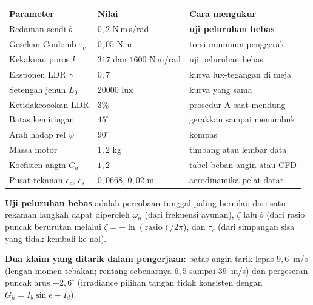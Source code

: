 \documentclass[11pt,a4paper]{article}
\newcommand{\degg}{^\circ}
\begin{document}
\begin{longtable}{p{5.4cm} p{3.0cm} p{6.4cm}}
\toprule
\textbf{Parameter} & \textbf{Nilai} & \textbf{Cara mengukur} \\
\midrule
\endhead
Redaman sendi $b$ & $0{,}2$ N\,m\,s/rad & \textbf{uji peluruhan bebas} \\
Gesekan Coulomb $\tau_c$ & $0{,}05$ N\,m & torsi minimum penggerak \\
Kekakuan poros $k$ & $317$ dan $1600$ N\,m/rad & uji peluruhan bebas \\
Eksponen LDR $\gamma$ & $0{,}7$ & kurva lux-tegangan di meja \\
Setengah jenuh $L_0$ & $20000$ lux & kurva yang sama \\
Ketidakcocokan LDR & $3\%$ & prosedur A saat mendung \\
Batas kemiringan & $45\degg$ & gerakkan sampai menumbuk \\
Arah hadap rel $\psi$ & $90\degg$ & kompas \\
Massa motor & $1{,}2$ kg & timbang atau lembar data \\
Koefisien angin $C_n$ & $1{,}2$ & tabel beban angin atau CFD \\
Pusat tekanan $e_c$, $e_s$ & $0{,}0668$, $0{,}02$ m & aerodinamika pelat datar \\
\bottomrule
\end{longtable}

\textbf{Uji peluruhan bebas} adalah percobaan tunggal paling bernilai: dari satu rekaman langkah dapat
diperoleh $\omega_n$ (dari frekuensi ayunan), $\zeta$ lalu $b$ (dari rasio puncak berurutan melalui
$\zeta = -\ln(\text{rasio})/2\pi$), dan $\tau_c$ (dari simpangan sisa yang tidak kembali ke nol).

\textbf{Dua klaim yang ditarik dalam pengerjaan:} batas angin tarik-lepas $9{,}6$~m/s (lengan momen tebakan;
rentang sebenarnya $6{,}5$ sampai $39$~m/s) dan pergeseran puncak arus $+2{,}6\degg$ (irradiance pilihan
tangan tidak konsisten dengan $G_h = I_b\sin e + I_d$).
\end{document}
